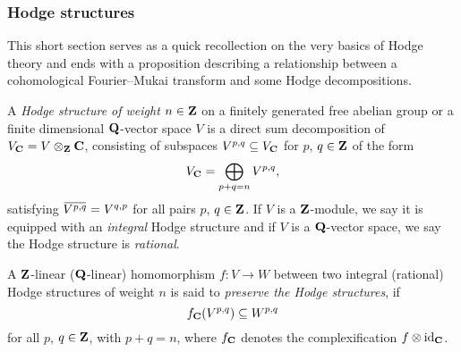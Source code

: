 
\subsubsection*{Hodge structures}

This short section serves as a quick recollection on the very basics of Hodge theory and ends with a proposition describing a relationship between a cohomological Fourier--Mukai transform and some Hodge decompositions. 

\begin{definition}
    A \emph{Hodge structure of weight $n \in \mathbf Z$} on a finitely generated free abelian group or a finite dimensional $\mathbf Q$-vector space $V$ is a direct sum decomposition of $V_\mathbf C = V \otimes_\mathbf Z \mathbf C$, consisting of subspaces $V^{p,q} \subseteq V_\mathbf C$ for $p$, $q \in \mathbf Z$ of the form
    \[  
        V_\mathbf C = \bigoplus_{p+q = n} V^{p,q},
    \]
    satisfying $\ols{V^{p,q}} = V^{q,p}$ for all pairs $p$, $q \in \mathbf Z$. If $V$ is a $\mathbf Z$-module, we say it is equipped with an \emph{integral} Hodge structure and if $V$ is a $\mathbf Q$-vector space, we say the Hodge structure is \emph{rational}.
    
    A $\mathbf Z$-linear (\resp $\mathbf Q$-linear) homomorphism $f \colon V \to W$ between two integral (\resp rational) Hodge structures of weight $n$ is said to \emph{preserve the Hodge structures}, if
    \[
        f_\mathbf C(V^{p,q}) \subseteq W^{p,q}
    \]  
    for all $p$, $q \in \mathbf Z$, with $p + q = n$, where $f_\mathbf C$ denotes the complexification $f \otimes \operatorname{id}_{\mathbf C}$.
\end{definition}

